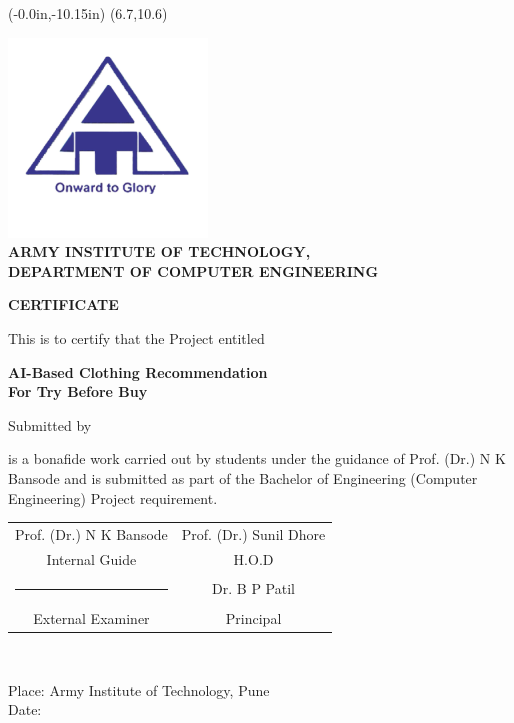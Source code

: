 \thisfancyput(-0.0in,-10.15in){
	\setlength{\unitlength}{1in}
	\framebox(6.7,10.6)
}
\setlength{\parindent}{0mm}
\begin{center}
	\includegraphics[scale=0.75]{components/images/logo.png} \\[0.5cm]
	
	{
		\bfseries \large
		ARMY INSTITUTE OF TECHNOLOGY, \\
		DEPARTMENT OF COMPUTER ENGINEERING
		\vspace*{\baselineskip}
	}

	{
		\bfseries \Large
		CERTIFICATE
		\vspace*{\baselineskip}
	}

	This is to certify that the Project entitled

	\vspace*{\baselineskip}

	{
		\bfseries \Large
		AI-Based Clothing Recommendation \\ For Try Before Buy \\
		\vspace*{\baselineskip}
	}

	Submitted by
	
	\nametable
\end{center}

is a bonafide work carried out by students under the guidance of Prof. (Dr.) N K Bansode and is submitted as part of the Bachelor of Engineering (Computer Engineering) Project requirement.

\vspace*{3 \baselineskip}

{
	\bgroup
	\def\arraystretch{0.7}
	\begin{table}[h!]
		\centering
		\begin{tabular}{ c c }
		Prof. (Dr.) N K Bansode & \hspace{40 mm} Prof. (Dr.) Sunil Dhore \\
		Internal Guide & \hspace{40 mm} H.O.D \\[1.5cm]
		\vspace{0.1cm} \rule{24ex}{0.15mm} & \hspace{40 mm} Dr. B P Patil \\
		External Examiner &\hspace{40 mm}Principal\\
		\end{tabular}\\[0.5cm]
	\end{table}
}

Place: Army Institute of Technology, Pune \\
Date: 

\pagebreak